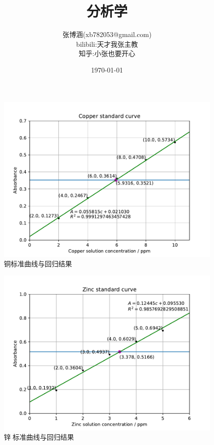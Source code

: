 \documentclass[UTF8,AutoFakeBold]{ctexbook}
\title{\kaishu\textbf {分析学}}
\author{\kaishu 张博涵(xb782053@gmail.com)\\
\kaishu bilibili:天才我张主教\\
\kaishu 知乎:小张也要开心}
\date{\kaishu \today}
\begin{document}
\begin{figure}[h]
 	\centering
	\includegraphics[scale=0.75]{Cu}
	\caption{铜标准曲线与回归结果}
 \end{figure}
 
 \begin{figure}[h]
 	\centering
	\includegraphics[scale=0.75]{Zn}
	\caption{锌标准曲线与回归结果}
 \end{figure}
\end{document}
